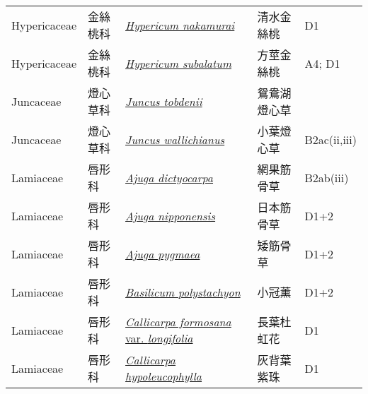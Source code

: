 {\begin{longtable}{p{2.5cm}p{2.5cm}p{4.5cm}p{2.5cm}p{3cm}}
    Hypericaceae & 金絲桃科 & \href{http://www.theplantlist.org/tpl1.1/search?q=Hypericum+nakamurai}{\textit{Hypericum nakamurai} } & 清水金絲桃 & D1 \index{Hypericum@\textit{Hypericum}!nakamurai@\textit{nakamurai}}  \index{清水金絲桃} \\
    Hypericaceae & 金絲桃科 & \href{http://www.theplantlist.org/tpl1.1/search?q=Hypericum+subalatum}{\textit{Hypericum subalatum} } & 方莖金絲桃 & A4; D1 \index{Hypericum@\textit{Hypericum}!subalatum@\textit{subalatum}}  \index{方莖金絲桃} \\
    Juncaceae & 燈心草科 & \href{http://www.theplantlist.org/tpl1.1/search?q=Juncus+tobdenii}{\textit{Juncus tobdenii} } & 鴛鴦湖燈心草 &  \index{Juncus@\textit{Juncus}!tobdenii@\textit{tobdenii}}  \index{鴛鴦湖燈心草} \\
    Juncaceae & 燈心草科 & \href{http://www.theplantlist.org/tpl1.1/search?q=Juncus+wallichianus}{\textit{Juncus wallichianus} } & 小葉燈心草 & B2ac(ii,iii) \index{Juncus@\textit{Juncus}!wallichianus@\textit{wallichianus}}  \index{小葉燈心草} \\
    Lamiaceae & 唇形科 & \href{http://www.theplantlist.org/tpl1.1/search?q=Ajuga+dictyocarpa}{\textit{Ajuga dictyocarpa} } & 網果筋骨草 & B2ab(iii) \index{Ajuga@\textit{Ajuga}!dictyocarpa@\textit{dictyocarpa}}  \index{網果筋骨草} \\
    Lamiaceae & 唇形科 & \href{http://www.theplantlist.org/tpl1.1/search?q=Ajuga+nipponensis}{\textit{Ajuga nipponensis} } & 日本筋骨草 & D1+2 \index{Ajuga@\textit{Ajuga}!nipponensis@\textit{nipponensis}}  \index{日本筋骨草} \\
    Lamiaceae & 唇形科 & \href{http://www.theplantlist.org/tpl1.1/search?q=Ajuga+pygmaea}{\textit{Ajuga pygmaea} } & 矮筋骨草 & D1+2 \index{Ajuga@\textit{Ajuga}!pygmaea@\textit{pygmaea}}  \index{矮筋骨草} \\
    Lamiaceae & 唇形科 & \href{http://www.theplantlist.org/tpl1.1/search?q=Basilicum+polystachyon}{\textit{Basilicum polystachyon} } & 小冠薰 & D1+2 \index{Basilicum@\textit{Basilicum}!polystachyon@\textit{polystachyon}}  \index{小冠薰} \\
    Lamiaceae & 唇形科 & \href{http://www.theplantlist.org/tpl1.1/search?q=Callicarpa+formosana+var.+longifolia}{\textit{Callicarpa formosana} var. \textit{longifolia} } & 長葉杜虹花 & D1 \index{Callicarpa@\textit{Callicarpa}!formosana@\textit{formosana}!var. longifolia@var. \textit{longifolia}}  \index{長葉杜虹花} \\
    Lamiaceae & 唇形科 & \href{http://www.theplantlist.org/tpl1.1/search?q=Callicarpa+hypoleucophylla}{\textit{Callicarpa hypoleucophylla} } & 灰背葉紫珠 & D1 \index{Callicarpa@\textit{Callicarpa}!hypoleucophylla@\textit{hypoleucophylla}}  \index{灰背葉紫珠} \\

\end{longtable}}
